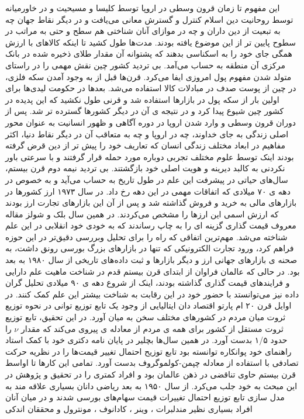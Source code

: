 \documentclass[a4paper,titlepage,12pt,fleqn,oneside]{report}
\begin{document}
این مفهوم تا زمان قرون وسطی در اروپا توسط کلیسا و مسیحیت و در خاورمیانه توسط روحانیت دین اسلام کنترل و گسترش معانی می‌یافت و در دیگر نقاط جهان چه به تبعیت از دین داران و چه در موازای آنان شناختی هم سطح و حتی به مراتب در سطوح پایین تر از این موضوع یافته بودند. مدت‌ها طول کشید تا اینکه کالاهای با ارزش همگی جای خود را به اسکناسی بدهند که پشتوانه آن مقدار طلای ذخیره شده در بانک مرکزی آن  منطقه به حساب می‌آمد. بی تردید کشور چین نقش مهمی را در راستای متولد شدن مفهوم پول امروزی ایفا می‌کرد. قرن‌ها قبل از به وجود آمدن سکه فلزی، در چین از پوست صدف در مبادلات کالا استفاده می‌شد. بعدها در حکومت لیدی‌ها برای اولین بار از سکه پول در بازارها استفاده شد و قرنی طول نکشید که این پدیده در کشور چین شیوع پیدا کرد و در نتیجه ی آن در دیگر کشورها گسترده تر شد. پس از دوران قرون وسطی و وارد شدن اروپا در دوره آگاهی و ظهور انسانیت به عنوان محور اصلی زندگی به جای خداوند، چه در اروپا و چه به متعاقب آن در دیگر نقاط دنیا، اکثر مفاهیم در ابعاد مختلف زندگی انسان که تعاریف خود را پیش تر از دین قرض گرفته بودند اینک توسط علوم مختلف تجربی دوباره مورد حمله قرار گرفتند و با سرعتی باور نکردنی به کالبد دیرینه و هویت اصلی خود بازگشتند.  بی تردید نیمه دوم قرن بیستم، سال‌های حیاتی در پیشرفت این علم در طول تاریخ به حساب می‌آید و به خصوص در دهه ی ۷۰ میلادی که اتفاقات مهمی در این دهه رخ داد. در سال ۱۹۷۳ ارز کشورها در بازارهای مالی به خرید و فروش گذاشته شد و پس از آن این بازارهای تجارت ارز بودند که ارزش اسمی این ارزها را مشخص می‌کردند. 
در همین سال بلک و شولز مقاله معروف قیمت گذاری گزینه ای را به چاپ رساندند\cite{black} که به خودی خود انقلابی در این علم شناخته می‌شد. مهم‌ترین اتفاقی که راه را برای تحلیل وبررسی دقیق‌تر در این حوزه فراهم کرد، ورود تجارت الکترونیکی که تنها در بازارهای بزرگ بورسی رونق داشت، به صحنه ی بازارهای جهانی ارز و دیگر بازارها و ثبت داده‌های تاریخی از سال ۱۹۸۰ به بعد بود.  در حالی که عالمان فراوان از ابتدای قرن بیستم قدم در شناخت ماهیت علم دارایی و فرایندهای قیمت گذاری گذاشته بودند، اینک از شروع دهه ی ۹۰ میلادی تحلیل گران داده نیز می‌توانستد با حضور خود در این رقابت به شناخت بیشتر این علم کمک کنند. 
در اوایل قرن ۲۰ ام پارتو اقتصاد دان ایتالیایی از وجود یک تابع توزیع 
توانی در نحوه توزیع ثروت میان مردم در کشورهای مختلف سخن به میان آورد. در این تحقیق، تابع توزیع ثروت مستقل از کشور برای همه ی مردم از معادله ی   پیروی می‌کند که مقدار $\nu$ را حدود ۱/۵ بدست آورد. در همین سال‌ها بچلیر در پایان نامه دکتری خود\cite{bac} با کمک استاد راهنمای خود پوانکاره توانسته بود تابع توزیح احتمال تغییر قیمت‌ها را  در نظریه حرکت تصادفی با استفاده از معادله چپمن-کولموگروف بدست آورد. تمامی این کارها تا اواسط قرن بیستم حاوی تناقضی در ذهن عالمان بود و افراد کمتری را در تحقیق و پژوهش در این مبحث به خود جلب می‌کرد. از سال ۱۹۵۰ به بعد ریاضی دانان بسیاری علاقه مند به مدل سازی تابع توزیع احتمال تغییرات قیمت سهام‌های بورسی شدند و در میان آنان افراد بسیاری نظیر مندلبرات \cite{mandel}، وینر ، کادانوف \cite{kada}، مونترول  \cite{mont} و محققان اندکی
\end{document}
